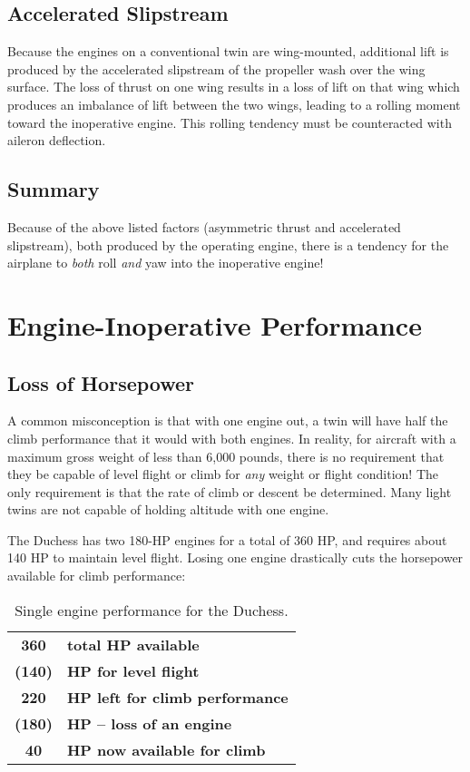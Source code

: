 \subsection{Accelerated Slipstream}

Because the engines on a conventional twin are wing-mounted, additional lift is produced by the accelerated
slipstream of the propeller wash over the wing surface. The loss of thrust on one wing results in a loss of lift on that
wing which produces an imbalance of lift between the two wings, leading to a rolling moment toward the
inoperative engine. This rolling tendency must be counteracted with aileron deflection.

\subsection{Summary}

Because of the above listed factors (asymmetric thrust and accelerated slipstream), both produced by the operating
engine, there is a tendency for the airplane to \emph{both} roll \emph{and} yaw into the inoperative engine!

\section{Engine-Inoperative Performance}

\subsection{Loss of Horsepower}

A common misconception is that with one engine out, a twin will have half the climb performance
that it would with both engines. In reality, for aircraft with a maximum gross weight of less than
6,000 pounds, there is no
requirement that they be capable of level flight or climb for \emph{any} weight or flight condition! The only requirement is
that the rate of climb or descent be determined. Many light twins are not capable of holding altitude with one engine.

The Duchess has two 180-HP engines for a total of 360 HP, and requires about 140 HP to maintain level flight.
Losing one engine drastically cuts the horsepower available for climb performance:

\begin{table}[h]
\centering
\begin{tabular}{cl}
\textbf{360}   & \textbf{total HP available}            \\
\textbf{(140)} & \textbf{HP for level flight}           \\ \hline
\textbf{220}   & \textbf{HP left for climb performance} \\
\textbf{(180)} & \textbf{HP -- loss of an engine}       \\ \hline
\textbf{40}    & \textbf{HP now available for climb}
\end{tabular}
\caption{Single engine performance for the Duchess.}
\end{table}

